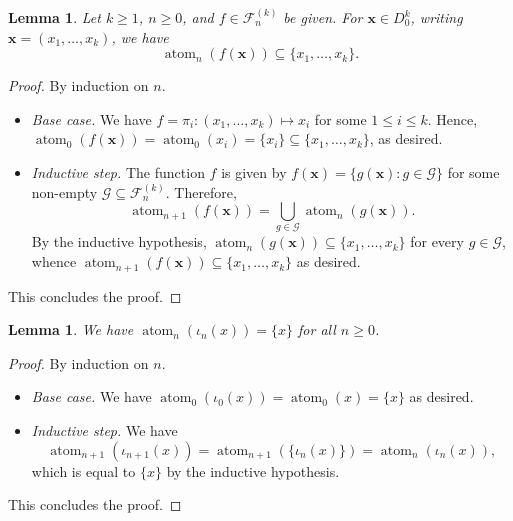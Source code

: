 \documentclass[a4paper,12pt]{article}
\newtheorem{lemma}[theorem]{Lemma}
\theoremstyle{definition}
\theoremstyle{remark}
\newcommand{\fset}[2]{\mathcal F^{(#1)}_{#2}}
\DeclareMathOperator{\atom}{atom}
\begin{document}
\begin{lemma}\label{lem:atom}
    Let $k \geq 1$, $n \geq 0$, and $f \in \fset kn$ be given. For $\mathbf x \in D_0^k$, writing $\mathbf x = (x_1, \dots, x_k)$, we have
    \[\atom_n(f(\mathbf x)) \subseteq \{x_1, \dots, x_k\}.\]
\end{lemma}
\begin{proof}
    By induction on $n$.
    \begin{itemize}
        \item \textit{Base case.} We have $f = \pi_i : (x_1, \dots, x_k) \mapsto x_i$ for some $1 \leq i \leq k$. Hence, $\atom_0(f(\mathbf x)) = \atom_0(x_i) = \{x_i\} \subseteq \{x_1, \dots, x_k\}$, as desired.
        \item \textit{Inductive step.} The function $f$ is given by $f(\mathbf x) = \{g(\mathbf x) : g \in \mathcal G\}$ for some non-empty $\mathcal G \subseteq \fset kn$. Therefore,
        \[\atom_{n+1}(f(\mathbf x)) = \bigcup_{g \in \mathcal G} \atom_n(g(\mathbf x)).\]
        By the inductive hypothesis, $\atom_n(g(\mathbf x)) \subseteq \{x_1, \dots, x_k\}$ for every $g \in \mathcal G$, whence $\atom_{n+1}(f(\mathbf x)) \subseteq \{x_1, \dots, x_k\}$ as desired.
    \end{itemize}
    This concludes the proof.
\end{proof}

\begin{lemma}\label{lem:atomiota}
    We have $\atom_n(\iota_n(x)) = \{x\}$ for all $n \geq 0$.
\end{lemma}
\begin{proof}
    By induction on $n$.
    \begin{itemize}
        \item \textit{Base case.} We have $\atom_0(\iota_0(x)) = \atom_0(x) = \{x\}$ as desired.
        \item \textit{Inductive step.} We have
        \[\atom_{n+1}(\iota_{n+1}(x)) = \atom_{n+1}(\{\iota_n(x)\}) = \atom_n(\iota_n(x)),\]
        which is equal to $\{x\}$ by the inductive hypothesis.
    \end{itemize}
    This concludes the proof.
\end{proof}
\end{document}
